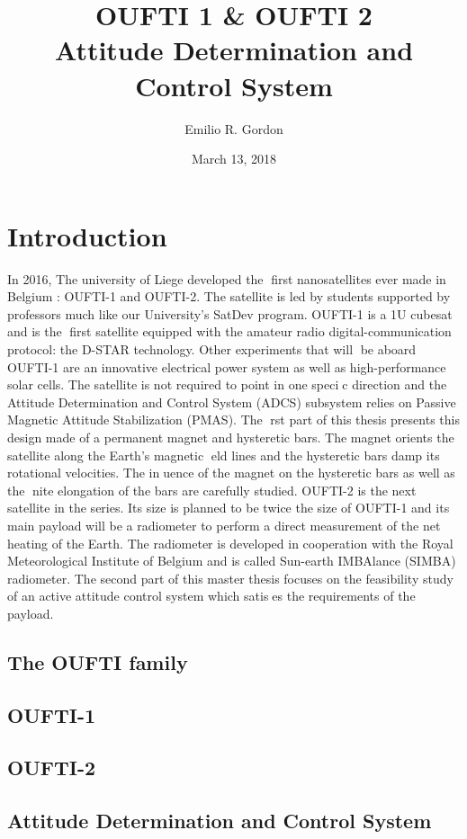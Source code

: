 \documentclass[10pt]{article}
\title{OUFTI 1 \& OUFTI 2 \\
  \large Attitude Determination and Control System}
\author{Emilio R. Gordon}
\date{March 13, 2018}
\begin{document}
\maketitle

\tableofcontents
\newpage
\section{Introduction }
In 2016, The university of Liege developed the first nanosatellites ever made in
Belgium : OUFTI-1 and OUFTI-2. The satellite is led by students supported by
professors much like our University's SatDev program. OUFTI-1 is a 1U cubesat and is
the first satellite equipped with the amateur radio digital-communication
protocol: the D-STAR technology. Other experiments that will be aboard OUFTI-1 are an
innovative electrical power system as well as high-performance solar cells. The satellite is
not required to point in one specic direction and the Attitude Determination and Control
System (ADCS) subsystem relies on Passive Magnetic Attitude Stabilization (PMAS). The
rst part of this thesis presents this design made of a permanent magnet and hysteretic bars.
The magnet orients the satellite along the Earth's magnetic eld lines and the hysteretic
bars damp its rotational velocities. The inuence of the magnet on the hysteretic bars as
well as the nite elongation of the bars are carefully studied.
OUFTI-2 is the next satellite in the series. Its size is planned to be twice the size of
OUFTI-1 and its main payload will be a radiometer to perform a direct measurement
of the net heating of the Earth. The radiometer is developed in cooperation with the
Royal Meteorological Institute of Belgium and is called Sun-earth IMBAlance (SIMBA)
radiometer. The second part of this master thesis focuses on the feasibility study of an
active attitude control system which satises the requirements of the payload.
\subsection{The OUFTI family}
\subsection{OUFTI-1}
\subsection{OUFTI-2}
\subsection{Attitude Determination and Control System}
\end{document}

